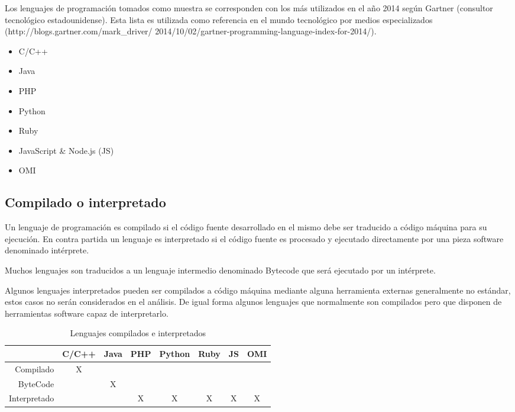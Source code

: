 Los lenguajes de programación tomados como muestra se corresponden con los más utilizados en el año 2014 
según Gartner (consultor tecnológico estadounidense). Esta lista es utilizada como referencia en el mundo tecnológico
por medios especializados (http://blogs.gartner.com/mark\_driver/ 2014/10/02/gartner-programming-language-index-for-2014/).

\begin{itemize}
   \item C/C++
   \item Java
   \item PHP
   \item Python
   \item Ruby
   \item JavaScript \& Node.js (JS)
   \item OMI
\end{itemize}

\subsection{Compilado o interpretado}
Un lenguaje de programación es compilado si el código fuente desarrollado en el mismo 
debe ser traducido a código máquina para su ejecución. En contra partida un lenguaje 
es interpretado si el código fuente es procesado y ejecutado directamente por una pieza software denominado intérprete.

Muchos lenguajes son traducidos a un lenguaje intermedio denominado Bytecode que 
será ejecutado por un intérprete.

Algunos lenguajes interpretados pueden ser compilados a código máquina mediante alguna herramienta
externas generalmente no estándar, estos casos no serán considerados en el análisis. De igual forma
algunos lenguajes que normalmente son compilados pero que disponen de herramientas software capaz de interpretarlo.

 
 \FloatBarrier
\begin{table}[h]
 \begin{center}
\begin{tabular}{|r|c|c|c|c|c|c|c|} \hline
 & C/C++ & Java & PHP  & Python & Ruby & JS & OMI \\ \hline
Compilado & X &  &  &  &  &  &  \\ \hline
ByteCode &  & X &  &  &  &  &  \\ \hline
Interpretado & & & X & X & X & X & X \\ \hline
\end{tabular}
\caption{Lenguajes compilados e interpretados}
\end{center}
\end{table}
\FloatBarrier

